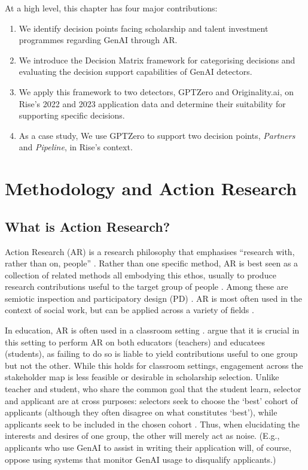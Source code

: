 At a high level, this chapter has four major contributions:

\begin{enumerate}
    \item We identify decision points facing scholarship and talent investment programmes regarding GenAI through AR.
    \item We introduce the Decision Matrix framework for categorising decisions and evaluating the decision support capabilities of GenAI detectors.
    \item We apply this framework to two detectors, GPTZero and Originality.ai, on Rise's 2022 and 2023 application data and determine their suitability for supporting specific decisions.
    \item As a case study, We use GPTZero to support two decision points, \emph{Partners} and \emph{Pipeline}, in Rise's context.
\end{enumerate}

\section{Methodology and Action Research}\label{sec:embedded}
\subsection{What is Action Research?}\label{ssec:par}
Action Research (AR) is a research philosophy that emphasises ``research with, rather than on, people'' \cite{bradbury_action_2003}. Rather than one specific method, AR is best seen as a collection of related methods all embodying this ethos, usually to produce research contributions useful to the target group of people \cite{lu_organizing_2023}. Among these are semiotic inspection \cite{DeSouza_Leitão_2009,Alvarado_Waern_2018} and participatory design  (PD) \cite{braun_using_2006,Griffiths_Johnson_Hartley_2007,blythe2014research,Knapp_Zeratzky_Kowitz_2016}. AR is most often used in the context of social work, but can be applied across a variety of fields \cite{dombrowski_social_2016,lu_organizing_2023}. 

In education, AR is often used in a classroom setting \cite{Mertler_2019}. \textcite{venn-wycherley_realities_2024} argue that it is crucial in this setting to perform AR on both educators (teachers) and educatees (students), as failing to do so is liable to yield contributions useful to one group but not the other. While this holds for classroom settings, engagement across the stakeholder map is less feasible or desirable in scholarship selection. Unlike teacher and student, who share the common goal that the student learn, selector and applicant are at cross purposes: selectors seek to choose the `best' cohort of applicants (although they often disagree on what constitutes `best'), while applicants seek to be included in the chosen cohort \cite{bergman2021seven}. Thus, when elucidating the interests and desires of one group, the other will merely act as noise. (E.g., applicants who use GenAI to assist in writing their application will, of course, oppose using systems that monitor GenAI usage to disqualify applicants.)

